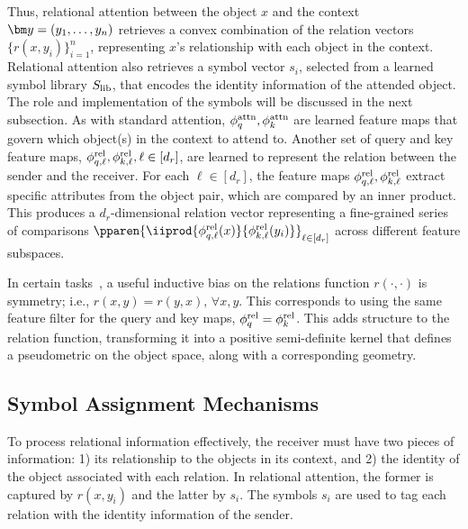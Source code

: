 
Thus, relational attention between the object $x$ and the context $\y = \ys$ retrieves a convex combination of the relation vectors $\{r(x, y_i)\}_{i=1}^{n}$, representing $x$'s relationship with each object in the context. Relational attention also retrieves a symbol vector $s_i$, selected from a learned symbol library $S_\mathrm{lib}$, that encodes the identity information of the attended object. The role and implementation of the symbols will be discussed in the next subsection. As with standard attention, $\phi_q^{\mathrm{attn}}, \phi_k^{\mathrm{attn}}$ are learned feature maps that govern which object(s) in the context to attend to. Another set of query and key feature maps, $\phi_{q, \ell}^{\mathrm{rel}}, \phi_{k, \ell}^{\mathrm{rel}}, \ell \in [d_r]$, are learned to represent the relation between the sender and the receiver. For each $\ell \in [d_r]$, the feature maps $\phi_{q, \ell}^{\mathrm{rel}}, \phi_{k, \ell}^{\mathrm{rel}}$ extract specific attributes from the object pair, which are compared by an inner product. This produces a $d_r$-dimensional relation vector representing a fine-grained series of comparisons $\pparen{\iiprod{\phiqrell{\ell}(x)}{\phikrell{\ell}(y_i)}}_{\ell \in [d_r]}$ across different feature subspaces.

In certain tasks~\citep{kergNeuralArchitectureInductive2022,altabaa2024abstractors,altabaaLearningHierarchicalRelational2024}, a useful inductive bias on the relations function $r(\cdot, \cdot)$ is symmetry; i.e., $r(x, y) = r(y, x),\, \forall x, y$. This corresponds to using the same feature filter for the query and key maps, $\phi_q^{\mathrm{rel}} = \phi_k^{\mathrm{rel}}$. This adds structure to the relation function, transforming it into a positive semi-definite kernel that defines a pseudometric on the object space, along with a corresponding geometry. %

\subsection{Symbol Assignment Mechanisms}

To process relational information effectively, the receiver must have two pieces of information: 1) its relationship to the objects in its context, and 2) the identity of the object associated with each relation. In relational attention, the former is captured by $r(x, y_i)$ and the latter by $s_i$.
The symbols $s_i$ are used to tag each relation with the identity information of the sender. %

